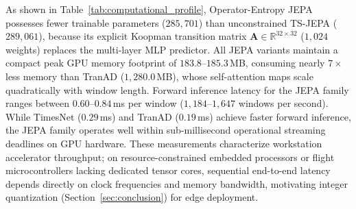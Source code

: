 As shown in Table~\ref{tab:computational_profile}, Operator-Entropy JEPA possesses fewer trainable parameters ($285{,}701$) than unconstrained TS-JEPA ($289{,}061$), because its explicit Koopman transition matrix $\mathbf{A} \in \mathbb{R}^{32 \times 32}$ ($1{,}024$ weights) replaces the multi-layer MLP predictor. All JEPA variants maintain a compact peak GPU memory footprint of $183.8\text{--}185.3\,$MB, consuming nearly $7\times$ less memory than TranAD ($1{,}280.0\,$MB), whose self-attention maps scale quadratically with window length. Forward inference latency for the JEPA family ranges between $0.60\text{--}0.84\,$ms per window ($1{,}184\text{--}1{,}647$ windows per second). While TimesNet ($0.29\,$ms) and TranAD ($0.19\,$ms) achieve faster forward inference, the JEPA family operates well within sub-millisecond operational streaming deadlines on GPU hardware. These measurements characterize workstation accelerator throughput; on resource-constrained embedded processors or flight microcontrollers lacking dedicated tensor cores, sequential end-to-end latency depends directly on clock frequencies and memory bandwidth, motivating integer quantization (Section~\ref{sec:conclusion}) for edge deployment.

